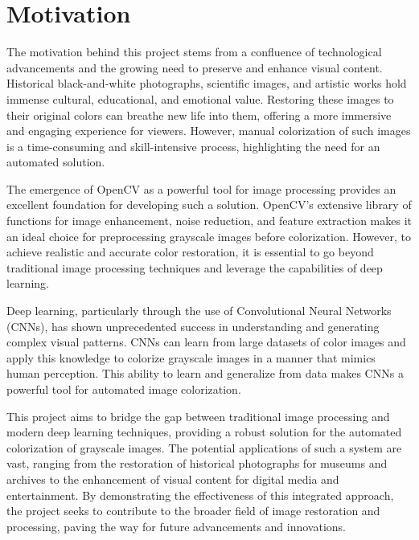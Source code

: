 \section{Motivation}
The motivation behind this project stems from a confluence of technological advancements and the growing need to preserve and enhance visual content. Historical black-and-white photographs, scientific images, and artistic works hold immense cultural, educational, and emotional value. Restoring these images to their original colors can breathe new life into them, offering a more immersive and engaging experience for viewers. However, manual colorization of such images is a time-consuming and skill-intensive process, highlighting the need for an automated solution.

The emergence of OpenCV as a powerful tool for image processing provides an excellent foundation for developing such a solution. OpenCV's extensive library of functions for image enhancement, noise reduction, and feature extraction makes it an ideal choice for preprocessing grayscale images before colorization. However, to achieve realistic and accurate color restoration, it is essential to go beyond traditional image processing techniques and leverage the capabilities of deep learning.

Deep learning, particularly through the use of Convolutional Neural Networks (CNNs), has shown unprecedented success in understanding and generating complex visual patterns. CNNs can learn from large datasets of color images and apply this knowledge to colorize grayscale images in a manner that mimics human perception. This ability to learn and generalize from data makes CNNs a powerful tool for automated image colorization.

This project aims to bridge the gap between traditional image processing and modern deep learning techniques, providing a robust solution for the automated colorization of grayscale images. The potential applications of such a system are vast, ranging from the restoration of historical photographs for museums and archives to the enhancement of visual content for digital media and entertainment. By demonstrating the effectiveness of this integrated approach, the project seeks to contribute to the broader field of image restoration and processing, paving the way for future advancements and innovations.


